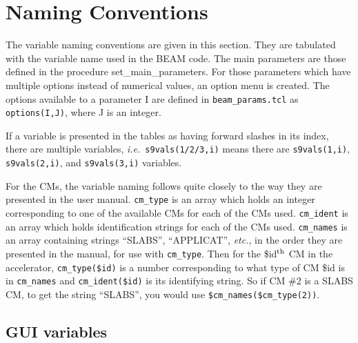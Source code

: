 \documentclass[12pt]{book}
\newcommand{\ie}{{\em i.e.}}
\begin{document}
\section{Naming Conventions}

The variable naming conventions are given in this section.  They are
tabulated with the variable name used in the BEAM code.  The main
parameters are those defined in the procedure {\sf set\_main\_parameters}.
For those parameters which have multiple options instead of numerical
values, an option menu is created.  The options available to a
parameter I are defined in {\tt beam\_params.tcl} as {\tt options(I,J)},
where J is an integer.

If a variable is presented in the tables as having forward slashes in
its index, there are multiple variables, \ie~\verb+s9vals(1/2/3,i)+
means there are \verb+s9vals(1,i)+, \verb+s9vals(2,i)+,
and \verb+s9vals(3,i)+ variables.

For the CMs, the variable naming follows quite closely to the way they
are presented in the user manual.  {\tt cm\_type} is an array which holds an
integer corresponding to one of the available CMs for each of the CMs
used.  {\tt cm\_ident} is an array which holds identification strings for each
of the CMs used.  {\tt cm\_names} is an array containing strings ``SLABS'',
``APPLICAT'', {\it etc.}, in the order they are presented in the manual,
for use with {\tt cm\_type}.  Then for the \$id$^{\rm th}$ CM in the
accelerator, {\tt cm\_type(\$id)}
is a number corresponding to what type of CM \$id is in {\tt cm\_names} and
{\tt cm\_ident(\$id)} is its identifying string.  So if CM \#2 is a SLABS CM,
to get the string ``SLABS'', you would use {\tt \$cm\_names(\$cm\_type(2))}.


\subsection{GUI variables}
\end{document}
